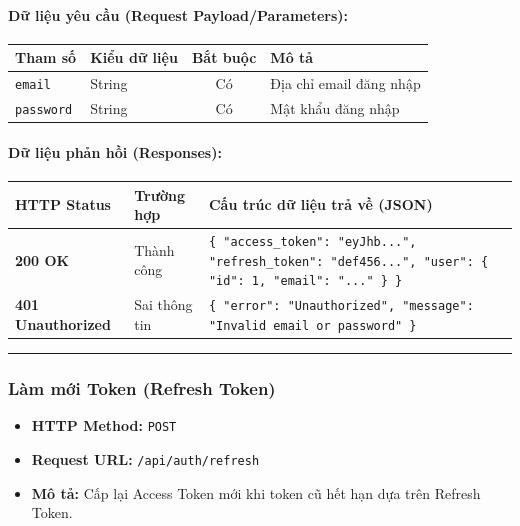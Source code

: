 \documentclass[12pt,a4paper]{article}
\begin{document}
\paragraph{Dữ liệu yêu cầu (Request Payload/Parameters):}
\begin{longtable}{|>{\raggedright\arraybackslash}p{2.8cm}|>{\raggedright\arraybackslash}p{2.2cm}|c|>{\raggedright\arraybackslash}p{7.0cm}|}
\hline
\textbf{Tham số} & \textbf{Kiểu dữ liệu} & \textbf{Bắt buộc} & \textbf{Mô tả} \\ \hline
\endhead
\texttt{email} & String & Có & Địa chỉ email đăng nhập \\ \hline
\texttt{password} & String & Có & Mật khẩu đăng nhập \\ \hline
\end{longtable}

\paragraph{Dữ liệu phản hồi (Responses):}
\begin{longtable}{|>{\raggedright\arraybackslash}p{2.8cm}|>{\raggedright\arraybackslash}p{3.2cm}|>{\raggedright\arraybackslash}p{8.0cm}|}
\hline
\textbf{HTTP Status} & \textbf{Trường hợp} & \textbf{Cấu trúc dữ liệu trả về (JSON)} \\ \hline
\endhead
\textbf{200 OK} & Thành công & \texttt{\{ "access\_token": "eyJhb...", "refresh\_token": "def456...", "user": \{ "id": 1, "email": "..." \} \}} \\ \hline
\textbf{401 Unauthorized} & Sai thông tin & \texttt{\{ "error": "Unauthorized", "message": "Invalid email or password" \}} \\ \hline
\end{longtable}

\vskip 0.4cm
\noindent\rule{\textwidth}{0.3pt}
\vskip 0.4cm

\subsubsection{Làm mới Token (Refresh Token)}
\begin{itemize}[leftmargin=*]
    \item \textbf{HTTP Method:} \texttt{POST}
    \item \textbf{Request URL:} \texttt{/api/auth/refresh}
    \item \textbf{Mô tả:} Cấp lại Access Token mới khi token cũ hết hạn dựa trên Refresh Token.
\end{itemize}
\end{document}
